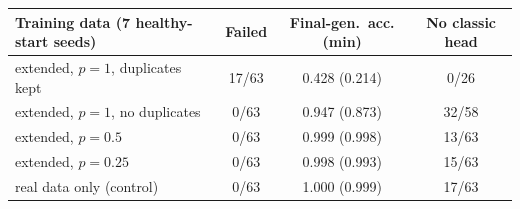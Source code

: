 \begin{tabular}{@{}lccc@{}}
\toprule
Training data (7 healthy-start seeds) & Failed & Final-gen.\ acc. (min) & No classic head\\
\midrule
extended, $p{=}1$, duplicates kept & 17/63 & 0.428 (0.214) & 0/26 \\
extended, $p{=}1$, no duplicates & 0/63 & 0.947 (0.873) & 32/58 \\
extended, $p{=}0.5$ & 0/63 & 0.999 (0.998) & 13/63 \\
extended, $p{=}0.25$ & 0/63 & 0.998 (0.993) & 15/63 \\
real data only (control) & 0/63 & 1.000 (0.999) & 17/63 \\
\bottomrule
\end{tabular}
